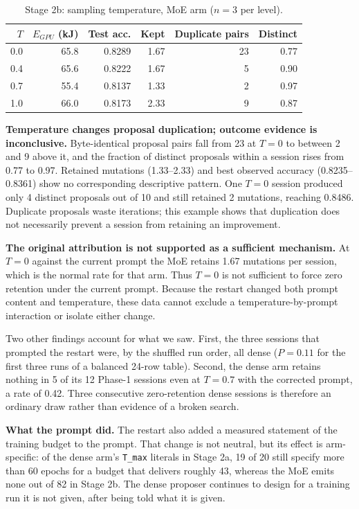 \begin{table}[htbp]
\centering
\caption{Stage 2b: sampling temperature, MoE arm ($n=3$ per level).}
\label{tab:temperature}
\small
\begin{tabular}{rrrrrr}
\toprule
$T$ & $E_{\mathit{GPU}}$ (kJ) & Test acc. & Kept & Duplicate pairs & Distinct \\
\midrule
0.0 & 65.8 & 0.8289 & 1.67 & 23 & 0.77 \\
0.4 & 65.6 & 0.8222 & 1.67 & 5  & 0.90 \\
0.7 & 55.4 & 0.8137 & 1.33 & 2  & 0.97 \\
1.0 & 66.0 & 0.8173 & 2.33 & 9  & 0.87 \\
\bottomrule
\end{tabular}
\end{table}

\textbf{Temperature changes proposal duplication; outcome evidence is inconclusive.} Byte-identical
proposal pairs fall from 23 at $T=0$ to between 2 and 9 above it, and the fraction
of distinct proposals within a session rises from 0.77 to 0.97. Retained
mutations (1.33--2.33) and best observed accuracy (0.8235--0.8361) show no
corresponding descriptive pattern. One $T=0$ session produced only 4 distinct proposals out of
10 and still retained 2 mutations, reaching 0.8486. Duplicate proposals waste
iterations; this example shows that duplication does not necessarily prevent a
session from retaining an improvement.

\textbf{The original attribution is not supported as a sufficient mechanism.} At $T=0$ against the current prompt
the MoE retains 1.67 mutations per session, which is the normal rate for that
arm. Thus $T=0$ is not sufficient to force zero retention under the current
prompt. Because the restart changed both prompt content and temperature, these
data cannot exclude a temperature-by-prompt interaction or isolate either change.

Two other findings account for what we saw. First, the three sessions that
prompted the restart were, by the shuffled run order, all dense
($P = 0.11$ for the first three runs of a balanced 24-row table). Second, the
dense arm retains nothing in 5 of its 12 Phase-1 sessions even at $T=0.7$ with
the corrected prompt, a rate of 0.42. Three consecutive zero-retention dense
sessions is therefore an ordinary draw rather than evidence of a broken search.

\textbf{What the prompt did.} The restart also added a measured statement of the
training budget to the prompt. That change is not neutral, but its effect is
arm-specific: of the dense arm's \texttt{T\_max} literals in Stage 2a, 19 of 20
still specify more than 60 epochs for a budget that delivers roughly 43, whereas
the MoE emits none out of 82 in Stage 2b. The dense proposer continues to design
for a training run it is not given, after being told what it is given.

